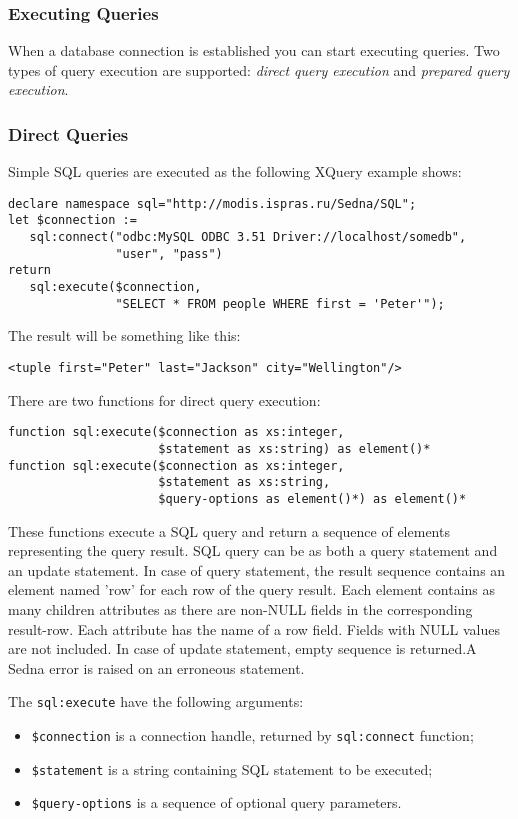 \documentclass[a4paper,12pt]{article}
\newenvironment{citemize}
{\begin{itemize}
  \setlength{\itemsep}{0pt}
  \setlength{\parskip}{0pt}
  \setlength{\parsep}{0pt}}
{\end{itemize}}
\begin{document}
\subsubsection*{Executing Queries}
When a database connection is established you can start executing queries. Two
types of query execution are supported: \emph{direct query execution} and
\emph{prepared query execution}.


\subsubsection*{Direct Queries}
Simple SQL queries are executed as the following XQuery example shows:
\small{
\begin{verbatim}
declare namespace sql="http://modis.ispras.ru/Sedna/SQL";
let $connection :=
   sql:connect("odbc:MySQL ODBC 3.51 Driver://localhost/somedb",
               "user", "pass")
return
   sql:execute($connection,
               "SELECT * FROM people WHERE first = 'Peter'");
\end{verbatim}}

The result will be something like this:
\small{
\begin{verbatim}
<tuple first="Peter" last="Jackson" city="Wellington"/>
\end{verbatim}}

There are two functions for direct query execution:
\begin{verbatim}
function sql:execute($connection as xs:integer,
                     $statement as xs:string) as element()*
function sql:execute($connection as xs:integer,
                     $statement as xs:string,
                     $query-options as element()*) as element()*
\end{verbatim}
These functions execute a SQL query and return a sequence of elements
representing the query result. SQL query can be as both a query statement and an
update statement. In case of query statement, the result sequence contains an
element named 'row' for each row of the query result. Each element contains as
many children attributes as there are non-NULL fields in the corresponding
result-row. Each attribute has the name of a row field. Fields with NULL values
are not included. In case of update statement, empty sequence is returned.A
Sedna error is raised on an erroneous statement.

The \verb!sql:execute! have the following arguments:
\begin{citemize}
\item\verb!$connection! is a connection handle, returned by \verb!sql:connect!
function;
\item\verb!$statement! is a string containing SQL statement to be executed;
\item\verb!$query-options! is a sequence of optional query parameters.
\end{citemize}
\end{document}
